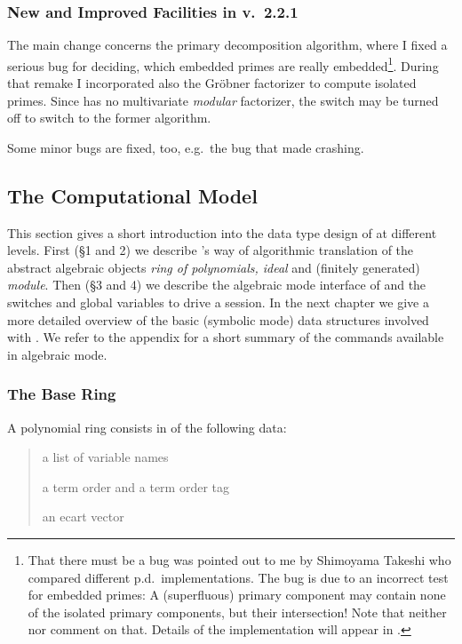 \subsubsection{New and Improved Facilities in v.~2.2.1\label{221}}

The main change concerns the primary decomposition algorithm, where I
fixed a serious bug for deciding, which embedded primes are really
embedded\footnote{That there must be a bug was pointed out to me by
Shimoyama Takeshi who compared different p.d.\ implementations. The
bug is due to an incorrect test for embedded primes: A (superfluous)
primary component may contain none of the isolated primary components,
but their intersection! Note that neither \cite{Gianni:88} nor \cite{Becker:93}
comment on that. Details of the implementation will appear in
\cite{Graebe:97}.}. During that remake I incorporated also the Gr\"obner
factorizer to compute isolated primes. Since \REDUCE has no
multivariate \emph{modular} factorizer, the switch 
may be turned off to switch to the former algorithm.



Some minor bugs are fixed, too, e.g.\ the bug that made 
crashing.




\subsection{The Computational Model}

This section gives a short introduction into the data type design of
 at different levels. First (\S 1 and 2) we describe 's way
of algorithmic translation of the abstract algebraic objects
\emph{ring of polynomials, ideal} and (finitely generated) \emph{module}.
Then (\S 3 and 4) we describe the algebraic mode interface of 
and the switches and global variables to drive a session. In the next
chapter we give a more detailed overview of the basic (symbolic mode) data
structures involved with . We refer to the appendix for a short
summary of the commands available in algebraic mode.

\subsubsection{The Base Ring}

A polynomial ring consists in  of the following data:
\begin{quote}
a list of variable names


a term order and a term order tag


an ecart vector

\end{quote}

